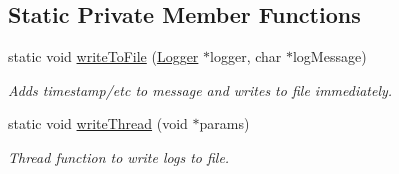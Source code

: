 \subsection*{Static Private Member Functions}
\begin{DoxyCompactItemize}
\item 
static void \hyperlink{class_logger_a02d0f677ff19e119df217cad09f1f0d6}{writeToFile} (\hyperlink{class_logger}{Logger} $\ast$logger, char $\ast$logMessage)
\begin{DoxyCompactList}\small\item\em Adds timestamp/etc to message and writes to file immediately. \end{DoxyCompactList}\item 
\hypertarget{class_logger_a155ddfc5bb6f98a3e5bf75a9a7ca7298}{
static void \hyperlink{class_logger_a155ddfc5bb6f98a3e5bf75a9a7ca7298}{writeThread} (void $\ast$params)}
\label{class_logger_a155ddfc5bb6f98a3e5bf75a9a7ca7298}

\begin{DoxyCompactList}\small\item\em Thread function to write logs to file. \end{DoxyCompactList}\end{DoxyCompactItemize}
